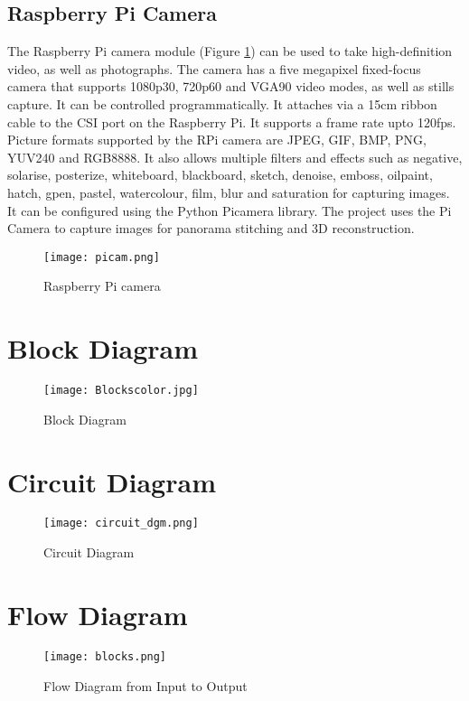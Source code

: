 \subsection{Raspberry Pi Camera}
The Raspberry Pi camera module (Figure \ref{RPi camera}) can be used to take high-definition video, as well as photographs. The camera has a five megapixel fixed-focus camera that supports 1080p30, 720p60 and VGA90 video modes, as well as stills capture. It can be controlled programmatically. It attaches via a 15cm ribbon cable to the CSI port on the Raspberry Pi. 
\newline
\newline
It supports a frame rate upto 120fps. Picture formats supported by the RPi camera are JPEG, GIF, BMP, PNG, YUV240 and RGB8888. It also allows multiple filters and effects such as negative, solarise, posterize, whiteboard, blackboard, sketch, denoise, emboss, oilpaint, hatch, gpen, pastel, watercolour, film, blur and saturation for capturing images.
It can be configured using the Python Picamera library. The project uses the Pi Camera to capture images for panorama stitching and 3D reconstruction.
\begin{figure}[H]
  \centering
  \texttt{[image: picam.png]}
  \caption{Raspberry Pi camera}  \label{RPi camera}	
\end{figure}

\section{Block Diagram}

\begin{figure}[H]
  \centering
  \texttt{[image: Blockscolor.jpg]}
  \caption{Block Diagram}
  \label{block}	
\end{figure}


\section{Circuit Diagram}

\begin{figure}[H]
  \centering
  \texttt{[image: circuit\_dgm.png]}
  \caption{Circuit Diagram}
  \label{circuit} 
\end{figure}


\section{Flow Diagram}
\begin{figure}[H]
  \centering
  \texttt{[image: blocks.png]}
  \caption{Flow Diagram from Input to Output}
  \label{Flow}	
\end{figure}

